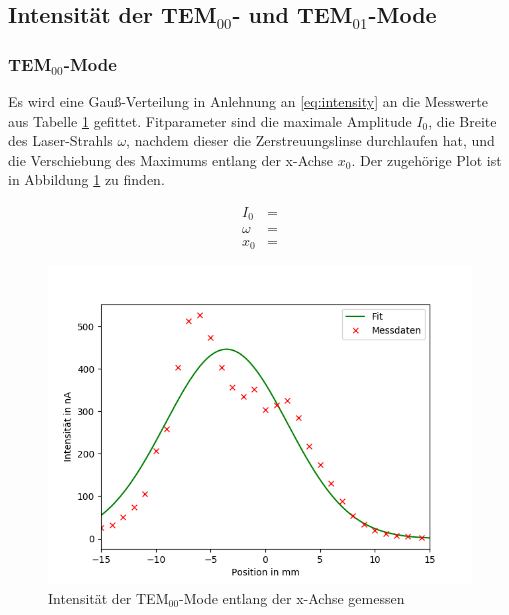 \subsection{Intensität der TEM$_{00}$- und TEM$_{01}$-Mode}
\subsubsection{TEM$_{00}$-Mode}

Es wird eine Gauß-Verteilung in Anlehnung an \eqref{eq:intensity} an die Messwerte aus Tabelle \ref{fig:TEM_00} gefittet. Fitparameter sind die maximale Amplitude $I_0$, die Breite des Laser-Strahls $\omega$, nachdem dieser die Zerstreuungslinse durchlaufen hat, und die Verschiebung des Maximums entlang der x-Achse $x_0$. Der zugehörige Plot ist in Abbildung \ref{fig:TEM_00} zu finden.


\begin{align}
	I_0 &=  \\
	\omega &=   \\
	x_0 &= 
\end{align}

	
 


\begin{figure}[h!]
	\centering
	\includegraphics[width=.7\textwidth]{build/TEM_00.png}
	\caption{Intensität der TEM$_{00}$-Mode entlang der x-Achse gemessen}
	\label{fig:TEM_00}
\end{figure} 

\clearpage

